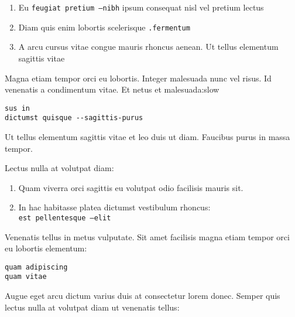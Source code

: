 \documentclass[9pt]{innovativeinnovation-cheatsheet}
\begin{document}
\begin{multicols*}{3}


\begin{enumerate}
  \item Eu \texttt{feugiat pretium --nibh}  ipsum consequat nisl vel pretium
        lectus
  \item Diam quis enim lobortis scelerisque \texttt{.fermentum}
  \item A arcu cursus vitae congue mauris rhoncus aenean. Ut tellus elementum
        sagittis vitae
\end{enumerate}


Magna etiam tempor orci eu lobortis. Integer malesuada nunc vel risus. Id
venenatis a condimentum vitae. Et netus et malesuada:slow

\begin{lstlisting}
sus in
dictumst quisque --sagittis-purus
\end{lstlisting}


Ut tellus elementum sagittis vitae et leo duis ut diam. Faucibus purus in
massa tempor.

Lectus nulla at volutpat diam:

\begin{enumerate}
  \item Quam viverra orci sagittis eu volutpat odio facilisis mauris sit.
  \item In hac habitasse platea dictumst vestibulum rhoncus:\\
    \texttt{est pellentesque --elit}
\end{enumerate}


Venenatis tellus in metus vulputate. Sit amet facilisis magna etiam tempor
orci eu lobortis elementum:

\begin{lstlisting}
quam adipiscing
quam vitae
\end{lstlisting}


Augue eget arcu dictum varius duis at consectetur lorem donec. Semper quis
lectus nulla at volutpat diam ut venenatis tellus:


\end{multicols*}
\end{document}
